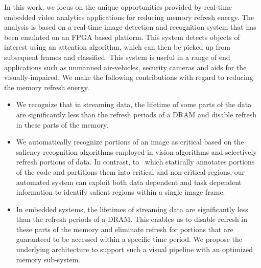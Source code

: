 In this work, we focus on the unique opportunities provided by real-time embedded video analytics applications for reducing memory refresh energy. The analysis is based on a real-time image detection and recognition system that has been emulated on an FPGA based platform. This system detects objects of interest using an attention algorithm, which can then be picked up from subsequent frames and classified. This system is useful in a range of end applications such as unmanned air-vehicles, security cameras and aids for the visually-impaired. We make the following contributions with regard to reducing the memory refresh energy.
\vspace{-0.1in}
\begin{itemize}[leftmargin=*]
\item We recognize that in streaming data, the lifetime of some parts of the data are significantly less than the refresh periods of a DRAM and disable refresh in these parts of the memory. 
\item We automatically recognize portions of an image as critical based on the saliency-recognition algorithms employed in vision algorithms and selectively refresh portions of data.
In contrast, to~\cite{Liu2011} which statically annotates portions of the code and partitions them into critical and non-critical regions, our automated system can exploit both data dependent and task dependent information to identify salient regions within a single image frame. 
\item In embedded systems, the lifetimes of streaming data are significantly less than the refresh periods of a DRAM. This enables us to disable refresh in these parts of the memory and eliminate refresh for portions that are guaranteed to be accessed within a specific time period. We propose the underlying architecture to support such a visual pipeline with an optimized memory sub-system.
\end{itemize}
